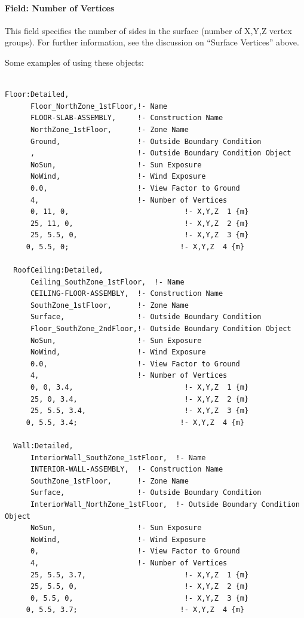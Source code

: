 \paragraph{Field: Number of Vertices}\label{field-number-of-vertices-2}

This field specifies the number of sides in the surface (number of X,Y,Z vertex groups). For further information, see the discussion on ``Surface Vertices'' above.

Some examples of using these objects:

\begin{lstlisting}

Floor:Detailed,
      Floor_NorthZone_1stFloor,!- Name
      FLOOR-SLAB-ASSEMBLY,     !- Construction Name
      NorthZone_1stFloor,      !- Zone Name
      Ground,                  !- Outside Boundary Condition
      ,                        !- Outside Boundary Condition Object
      NoSun,                   !- Sun Exposure
      NoWind,                  !- Wind Exposure
      0.0,                     !- View Factor to Ground
      4,                       !- Number of Vertices
      0, 11, 0,                           !- X,Y,Z  1 {m}
      25, 11, 0,                          !- X,Y,Z  2 {m}
      25, 5.5, 0,                         !- X,Y,Z  3 {m}
     0, 5.5, 0;                          !- X,Y,Z  4 {m}

  RoofCeiling:Detailed,
      Ceiling_SouthZone_1stFloor,  !- Name
      CEILING-FLOOR-ASSEMBLY,  !- Construction Name
      SouthZone_1stFloor,      !- Zone Name
      Surface,                 !- Outside Boundary Condition
      Floor_SouthZone_2ndFloor,!- Outside Boundary Condition Object
      NoSun,                   !- Sun Exposure
      NoWind,                  !- Wind Exposure
      0.0,                     !- View Factor to Ground
      4,                       !- Number of Vertices
      0, 0, 3.4,                          !- X,Y,Z  1 {m}
      25, 0, 3.4,                         !- X,Y,Z  2 {m}
      25, 5.5, 3.4,                       !- X,Y,Z  3 {m}
     0, 5.5, 3.4;                        !- X,Y,Z  4 {m}

  Wall:Detailed,
      InteriorWall_SouthZone_1stFloor,  !- Name
      INTERIOR-WALL-ASSEMBLY,  !- Construction Name
      SouthZone_1stFloor,      !- Zone Name
      Surface,                 !- Outside Boundary Condition
      InteriorWall_NorthZone_1stFloor,  !- Outside Boundary Condition Object
      NoSun,                   !- Sun Exposure
      NoWind,                  !- Wind Exposure
      0,                       !- View Factor to Ground
      4,                       !- Number of Vertices
      25, 5.5, 3.7,                       !- X,Y,Z  1 {m}
      25, 5.5, 0,                         !- X,Y,Z  2 {m}
      0, 5.5, 0,                          !- X,Y,Z  3 {m}
     0, 5.5, 3.7;                        !- X,Y,Z  4 {m}
\end{lstlisting}

